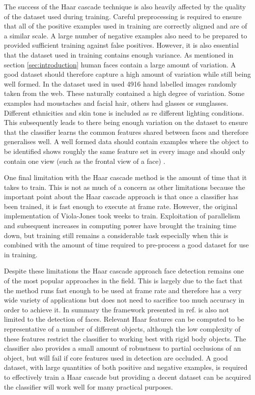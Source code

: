 \documentclass[conference]{IEEEtran}
\begin{document}
The success of the Haar cascade technique is also heavily affected by the quality of the dataset used during training. Careful preprocessing is required to ensure that all of the positive examples used in training are correctly aligned and are of a similar scale. A large number of negative examples also need to be prepared to provided sufficient training against false positives. However, it is also essential that the dataset used in training contains enough variance. As mentioned in section \ref{sec:introduction} human faces contain a large amount of variation. A good dataset should therefore capture a high amount of variation while still being well formed. In the dataset used in \cite{viola2004robust} used 4916 hand labelled images randomly taken from the web. These naturally contained a high degree of variation. Some examples had moustaches and facial hair, others had glasses or sunglasses. Different ethnicities and skin tone is included as re different lighting conditions. This subsequently leads to there being enough variation on the dataset to ensure that the classifier learns the common features shared between faces and therefore generalises well. A well formed data should contain examples where the object to be identified shows roughly the same feature set in every image and should only contain one view (such as the frontal view of a face) \cite{bradski2008learning}.

One final limitation with the Haar cascade method is the amount of time that it takes to train. This is not as much of a concern as other limitations because the important point about the Haar cascade approach is that once a classifier has been trained, it is fast enough to execute at frame rate. However, the original implementation of Viola-Jones took weeks to train. Exploitation of parallelism \cite{viola2004robust} and subsequent increases in computing power have brought the training time down, but training still remains a considerable task especially when this is combined with the amount of time required to pre-process a good dataset for use in training.

Despite these limitations the Haar cascade approach face detection remains one of the most popular approaches in the field. This is largely due to the fact that the method runs fast enough to be used at frame rate and therefore has a very wide variety of applications but does not need to sacrifice too much accuracy in order to achieve it. In summary the framework presented in ref. \cite{viola2004robust} is also not limited to the detection of faces. Relevant Haar features can be computed to be representative of a number of different objects, although the low complexity of these features restrict the classifier to working best with rigid body objects. The classifier also provides a small amount of robustness to partial occlusions of an object, but will fail if core features used in detection are occluded. A good dataset, with large quantities of both positive and negative examples, is required to effectively train a Haar cascade but providing  a decent dataset can be acquired the classifier will work well for many practical purposes.
\end{document}
